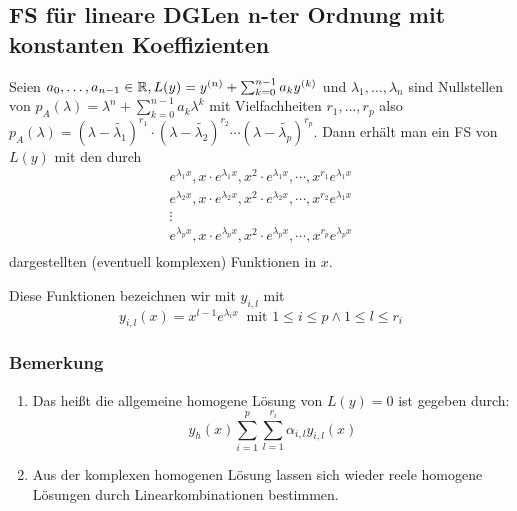 \subsection{FS für lineare DGLen n-ter Ordnung mit konstanten Koeffizienten}
Seien $a_0, \ldots, a_{n-1} \in \mathbb{R}, L(y) = y^{(n)} + \sum_{k=0}^{n-1} a_k y^{(k)}$ und
$\lambda_1, \ldots, \lambda_n$ sind Nullstellen von $p_A(\lambda) = \lambda^n + \sum_{k=0}^{n-1} a_k \lambda^k$
mit Vielfachheiten $r_1, \ldots, r_p$ also $p_A(\lambda) = {(\lambda - \tilde{\lambda_1})}^{r_1} \cdot
{(\lambda - \tilde{\lambda_2})}^{r_2} \cdots {(\lambda - \tilde{\lambda_p})}^{r_p}$. Dann erhält man ein FS von
$L(y)$ mit den durch
\begin{eqnarray*}
	e^{\lambda_1 x}, x \cdot e^{\lambda_1 x}, x^2 \cdot e^{\lambda_1 x}, \cdots, x^{r_1} e^{\lambda_1 x} \\
	e^{\lambda_2 x}, x \cdot e^{\lambda_2 x}, x^2 \cdot e^{\lambda_2 x}, \cdots, x^{r_2} e^{\lambda_1 x} \\
	\vdots \\
	e^{\lambda_p x}, x \cdot e^{\lambda_p x}, x^2 \cdot e^{\lambda_p x}, \cdots, x^{r_p} e^{\lambda_p x} \\
\end{eqnarray*} 
dargestellten (eventuell komplexen) Funktionen in $x$.

Diese Funktionen bezeichnen wir mit $y_{i,l}$ mit
\begin{equation*}
	y_{i,l}(x) = x^{l-1} e^{\lambda_i x} \ \text{ mit } 1 \leq i \leq p \land 1 \leq l \leq r_i
\end{equation*}

\subsubsection{Bemerkung}
\begin{enumerate}
	\item Das heißt die allgemeine homogene Lösung von $L(y)=0$ ist gegeben durch:
		\begin{equation*}
			y_h(x) \sum_{i=1}^p \sum_{l=1}^{r_i} \alpha_{i,l} y_{i,l}(x)
		\end{equation*} 
	\item Aus der komplexen homogenen Lösung lassen sich wieder reele homogene Lösungen durch Linearkombinationen
		bestimmen. 
\end{enumerate}